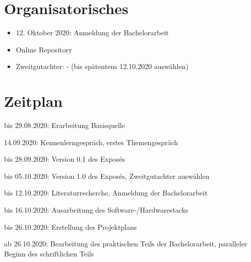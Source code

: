 \documentclass[11pt]{article}
\newcommand{\cmark}{\ding{51}}%
\newcommand{\done}{\rlap{$\square$}{\raisebox{2pt}{\large\hspace{1pt}\cmark}}%
\hspace{-2.5pt}}
\begin{document}
    \section{Organisatorisches}
    \begin{itemize}
        \item 12. Oktober 2020: Anmeldung der Bachelorarbeit
        \item Online Repository~\cite{github}
        \item Zweitgutachter: - (bis spätentens 12.10.2020 auswählen)
    \end{itemize}

    \newpage

    \section{Zeitplan}
    \begin{todolist}
        \item[\done] bis 29.08.2020: Erarbeitung Basisquelle
        \item[\done] 14.09.2020: Kennenlerngespräch, erstes Themengespräch
        \item[\done] bis 28.09.2020: Version 0.1 des Exposés
        \item bis 05.10.2020: Version 1.0 des Exposés, Zweitgutachter auswählen
        \item bis 12.10.2020: Literaturrecherche, Anmeldung der Bachelorarbeit
        \item bis 16.10.2020: Ausarbeitung des Software-/Hardwarestacks
        \item bis 26.10.2020: Erstellung des Projektplans
        \item ab 26.10.2020: Bearbeitung des praktischen Teils der Bachelorarbeit, paralleler Beginn des
        schriftlichen Teils
    \end{todolist}

    \newpage

    \listoffigures

    ~\nocite{*}
    
    
\end{document}
